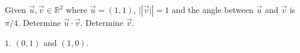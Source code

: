 
\begin{Exercise}[
name={},
title={}, 
difficulty=0,
origin={\cite{YL}}]
Given $\vec{u},\vec{v}\in \mathbb{R}^2$ where $\vec{u}=(1,1)$, $\lvert|\vec{v}\rvert|=1$ and the angle between $\vec{u}$ and $\vec{v}$ is $\pi/4$.
\Question Determine $\vec{u}\cdot\vec{v}$.
\Question Determine $\vec{v}$.
\end{Exercise}

\begin{Answer}
\Question $1$.
\Question $(0,1)$ and $(1,0)$.
\end{Answer}
